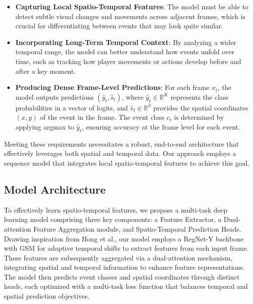 \documentclass[conference]{IEEEtran}
\begin{document}
\begin{itemize}
    \item \textbf{Capturing Local Spatio-Temporal Features}: The model must be able to detect subtle visual changes and movements across adjacent frames, which is crucial for differentiating between events that may look quite similar.
    \item \textbf{Incorporating Long-Term Temporal Context}: By analyzing a wider temporal range, the model can better understand how events unfold over time, such as tracking how player movements or actions develop before and after a key moment.
    \item \textbf{Producing Dense Frame-Level Predictions}: For each frame \(x_t\), the model outputs predictions \((\hat{y}_t, \hat{s}_t)\), where \(\hat{y}_t \in \mathbb{R}^K\) represents the class probabilities in a vector of logits, and \(\hat{s}_t \in \mathbb{R}^2\) provides the spatial coordinates \((x, y)\) of the event in the frame. The event class \(c_t\) is determined by applying argmax to \(\hat{y}_t\), ensuring accuracy at the frame level for each event.
\end{itemize}

Meeting these requirements necessitates a robust, end-to-end architecture that effectively leverages both spatial and temporal data. Our approach employs a sequence model that integrates local spatio-temporal features to achieve this goal.


\subsection{Model Architecture}
To effectively learn spatio-temporal features, we propose a multi-task deep learning model comprising three key components: a Feature Extractor, a Dual-attention Feature Aggregation module, and Spatio-Temporal Prediction Heads. Drawing inspiration from Hong et al.\cite{spot22}, our model employs a RegNet-Y backbone \cite{radosavovic2020designingnetworkdesignspaces} with GSM \cite{9156729} for adaptive temporal shifts to extract features from each input frame. These features are subsequently aggregated via a dual-attention mechanism, integrating spatial and temporal information to enhance feature representations. The model then predicts event classes and spatial coordinates through distinct heads, each optimized with a multi-task loss function that balances temporal and spatial prediction objectives.

\end{document}
